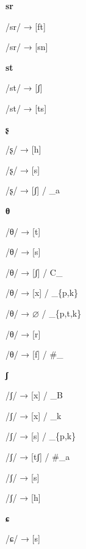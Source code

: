 \begin{center}\textbf{sr}\end{center}
\begin{multicols}{4}
\noindent /sr/ → [ft]

\noindent /sr/ → [sn]
\end{multicols}


\begin{center}\textbf{st}\end{center}
\begin{multicols}{4}
\noindent /st/ → [ʃ]

\noindent /st/ → [ts]
\end{multicols}


\begin{center}\textbf{ʂ}\end{center}
\begin{multicols}{4}
\noindent /ʂ/ → [h]

\noindent /ʂ/ → [s]

\noindent /ʂ/ → [ʃ] / \_a
\end{multicols}


\begin{center}\textbf{θ}\end{center}
\begin{multicols}{4}
\noindent /θ/ → [t]

\noindent /θ/ → [s]

\noindent /θ/ → [ʃ] / C\_

\noindent /θ/ → [x] / \_\{p,k\}

\noindent /θ/ → $\varnothing$ / \_\{p,t,k\}

\noindent /θ/ → [r]

\noindent /θ/ → [f] / \#\_
\end{multicols}


\begin{center}\textbf{ʃ}\end{center}
\begin{multicols}{4}
\noindent /ʃ/ → [x] / \_B

\noindent /ʃ/ → [x] / \_k

\noindent /ʃ/ → [s] / \_\{p,k\}

\noindent /ʃ/ → [tʃ] / \#\_a

\noindent /ʃ/ → [s]

\noindent /ʃ/ → [h]
\end{multicols}


\begin{center}\textbf{ɕ}\end{center}
\begin{multicols}{4}
\noindent /ɕ/ → [s]
\end{multicols}

